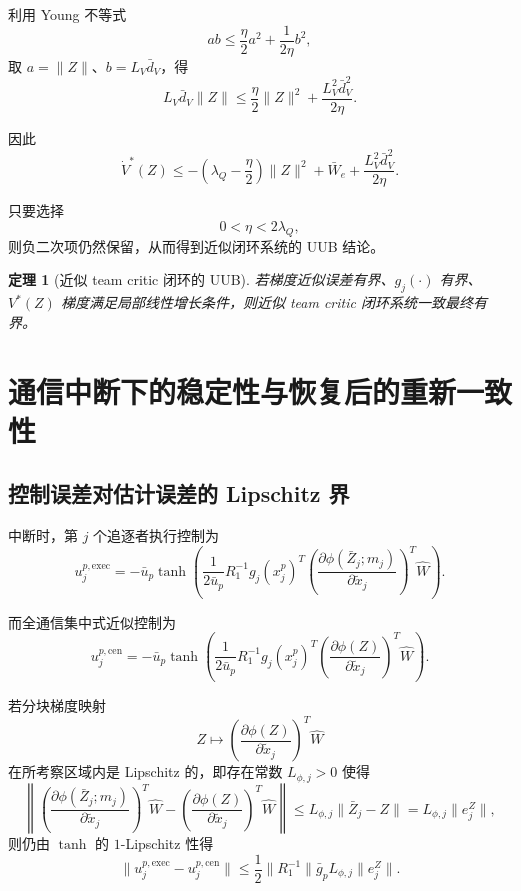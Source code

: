 \documentclass[12pt,a4paper]{ctexart}
\newtheorem{theorem}{定理}
\begin{document}
利用 Young 不等式
\begin{equation}
ab\le \frac{\eta}{2}a^2+\frac{1}{2\eta}b^2,
\end{equation}
取 $a=\|Z\|$、$b=L_V\bar d_V$，得
\begin{equation}
L_V\bar d_V\|Z\|
\le
\frac{\eta}{2}\|Z\|^2+\frac{L_V^2\bar d_V^2}{2\eta}.
\end{equation}

因此
\begin{equation}
\dot V^*(Z)
\le
-\left(\lambda_Q-\frac{\eta}{2}\right)\|Z\|^2
+
\bar W_e
+
\frac{L_V^2\bar d_V^2}{2\eta}.
\end{equation}

只要选择
\begin{equation}
0<\eta<2\lambda_Q,
\end{equation}
则负二次项仍然保留，从而得到近似闭环系统的 UUB 结论。

\begin{theorem}[近似 team critic 闭环的 UUB]
若梯度近似误差有界、$g_j(\cdot)$ 有界、$V^*(Z)$ 梯度满足局部线性增长条件，则近似 team critic 闭环系统一致最终有界。
\end{theorem}

\section{通信中断下的稳定性与恢复后的重新一致性}

\subsection{控制误差对估计误差的 Lipschitz 界}

中断时，第 $j$ 个追逐者执行控制为
\begin{equation}
u_j^{p,\mathrm{exec}}
=
-\bar u_p
\tanh\!\left(
\frac{1}{2\bar u_p}
R_1^{-1}
g_j(x_j^p)^T
\left(\frac{\partial \phi(\bar Z_j;m_j)}{\partial \tilde x_j}\right)^T\hat W
\right).
\end{equation}

而全通信集中式近似控制为
\begin{equation}
u_j^{p,\mathrm{cen}}
=
-\bar u_p
\tanh\!\left(
\frac{1}{2\bar u_p}
R_1^{-1}
g_j(x_j^p)^T
\left(\frac{\partial \phi(Z)}{\partial \tilde x_j}\right)^T\hat W
\right).
\end{equation}

若分块梯度映射
\begin{equation}
Z\mapsto \left(\frac{\partial \phi(Z)}{\partial \tilde x_j}\right)^T\hat W
\end{equation}
在所考察区域内是 Lipschitz 的，即存在常数 $L_{\phi,j}>0$ 使得
\begin{equation}
\left\|
\left(\frac{\partial \phi(\bar Z_j;m_j)}{\partial \tilde x_j}\right)^T\hat W
-
\left(\frac{\partial \phi(Z)}{\partial \tilde x_j}\right)^T\hat W
\right\|
\le
L_{\phi,j}\|\bar Z_j-Z\|
=
L_{\phi,j}\|e_j^Z\|,
\end{equation}
则仍由 $\tanh$ 的 $1$-Lipschitz 性得
\begin{equation}
\|u_j^{p,\mathrm{exec}}-u_j^{p,\mathrm{cen}}\|
\le
\frac{1}{2}\|R_1^{-1}\|\bar g_p L_{\phi,j}\|e_j^Z\|.
\end{equation}
\end{document}
